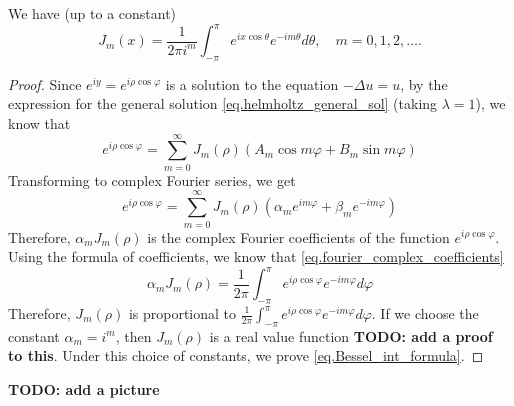 \begin{proposition} We have (up to a constant)
\begin{equation}\label{eq.Bessel_int_formula}
    J_m(x)=\frac{1}{2 \pi i^m} \int_{-\pi}^\pi e^{i x \cos \theta} e^{-i m \theta} d \theta, \quad m=0,1,2, \ldots .
\end{equation}
\end{proposition}
\begin{proof}
Since $e^{iy} = e^{i\rho \cos \varphi}$ is a solution to the equation $-\Delta u = u$, by the expression for the general solution \eqref{eq.helmholtz_general_sol} (taking $\lambda = 1$), we know that 
\begin{equation}
    e^{i\rho \cos \varphi} = \sum_{m = 0}^\infty J_m(\rho)\left(A_m \cos m \varphi+B_m \sin m \varphi\right)
\end{equation}
Transforming to complex Fourier series, we get 
\begin{equation}
    e^{i\rho \cos \varphi} = \sum_{m = 0}^\infty J_m(\rho)\left(\alpha_m e^{i m \varphi}+\beta_m e^{-i m \varphi}\right)
\end{equation}
Therefore, $\alpha_m J_m(\rho)$ is the complex Fourier coefficients of the function $e^{i\rho \cos \varphi}$. Using the formula of coefficients, we know that \eqref{eq.fourier_complex_coefficients}
\begin{equation}
    \alpha_m J_m(\rho) = \frac{1}{2 \pi} \int_{-\pi}^\pi e^{i\rho \cos \varphi} e^{- i m \varphi} d\varphi
\end{equation}
Therefore, $J_m(\rho)$ is proportional to $\frac{1}{2 \pi} \int_{-\pi}^\pi e^{i\rho \cos \varphi} e^{- i m \varphi} d\varphi$. If we choose the constant $\alpha_m = i^{m}$, then $J_m(\rho)$ is a real value function \textbf{TODO: add a proof to this}. Under this choice of constants, we prove \eqref{eq.Bessel_int_formula}. 
\end{proof}

\textbf{TODO: add a picture}

